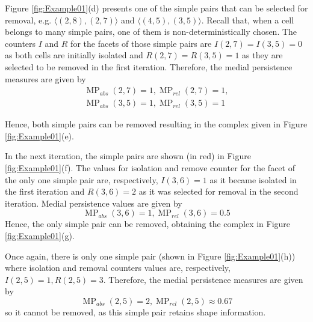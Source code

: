 \documentclass[journal]{IEEEtran}
\DeclareMathOperator{\MP}{MP}
\begin{document}
Figure \ref{fig:Example01}(d) presents one of the simple pairs that can be selected for removal,
e.g. $\langle (2,8), (2,7) \rangle$ and $\langle (4,5), (3,5) \rangle$. Recall that, when a cell
belongs to many simple pairs, one of them is non-deterministically chosen. The counters 
$I$ and $R$ for the facets of those simple pairs are $I(2,7)=I(3,5)=0$ as both cells are initially
isolated and $R(2,7)=R(3,5)=1$ as they are selected to be removed in the first iteration. Therefore,
the medial persistence measures are given by
\begin{eqnarray*}
\MP_{abs}(2,7)=1, \MP_{rel}(2,7)=1,\\
\MP_{abs}(3,5)=1, \MP_{rel}(3,5)=1
\end{eqnarray*}
 
Hence, both simple pairs can be removed resulting in the complex given in Figure \ref{fig:Example01}(e). 

In the next iteration, the simple pairs are shown (in red) in Figure \ref{fig:Example01}(f). 
The values for isolation and remove counter for the facet of the only one simple pair are, respectively,
$I(3,6)=1$ as it became isolated in the first iteration and $R(3,6)=2$ as it was selected for removal in
the second iteration. Medial persistence values are given by
$$
\MP_{abs}(3,6)=1, \MP_{rel}(3,6)=0.5
$$
Hence, the only simple pair can be removed, obtaining the complex in Figure \ref{fig:Example01}(g).

Once again, there is only one simple pair (shown in Figure \ref{fig:Example01}(h)) where 
isolation and removal counters values are, respectively, $I(2,5)=1, R(2,5)=3$. Therefore, 
the medial persistence measures are given by
$$
\MP_{abs}(2,5)=2, \MP_{rel}(2,5) \approx 0.67
$$
so it cannot be removed, as this simple pair retains shape information.
\end{document}
